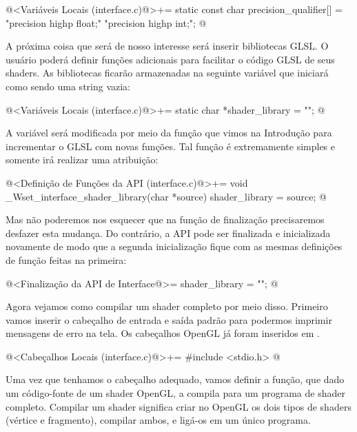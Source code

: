 \iniciocodigo
@<Variáveis Locais (interface.c)@>+=
static const char precision_qualifier[] = "precision highp float;\n"
                                          "precision highp int;\n";
@
\fimcodigo

A próxima coisa que será de nosso interesse será inserir bibliotecas
GLSL. O usuário poderá definir funções adicionais para facilitar o
código GLSL de seus shaders. As bibliotecas ficarão armazenadas na
seguinte variável que iniciará como sendo uma string vazia:

\iniciocodigo
@<Variáveis Locais (interface.c)@>+=
static char *shader_library = "";
@
\fimcodigo

A variável será modificada por meio da função que vimos na Introdução
para incrementar o GLSL com novas funções. Tal função é extremamente
simples e somente irá realizar uma atribuição:

\iniciocodigo
@<Definição de Funções da API (interface.c)@>+=
void _Wset_interface_shader_library(char *source){
  shader_library = source;
}
@
\fimcodigo

Mas não poderemos nos esquecer que na função de finalização
precisaremos desfazer esta mudança. Do contrário, a API pode ser
finalizada e inicializada novamente de modo que a segunda
inicialização fique com as mesmas definições de função feitas na
primeira:

\iniciocodigo
@<Finalização da API de Interface@>=
shader_library = "";
@
\fimcodigo

Agora vejamos como compilar um shader completo por meio
disso. Primeiro vamos inserir o cabeçalho de entrada e saída padrão
para podermos imprimir mensagens de erro na tela. Os cabeçalhos OpenGL
já foram inseridos em .

\iniciocodigo
@<Cabeçalhos Locais (interface.c)@>+=
#include <stdio.h>
@
\fimcodigo

Uma vez que tenhamos o cabeçalho adequado, vamos definir a função, que
dado um código-fonte de um shader OpenGL, a compila para um programa
de shader completo. Compilar um shader significa criar no OpenGL os
dois tipos de shaders (vértice e fragmento), compilar ambos, e ligá-os
em um único programa.

